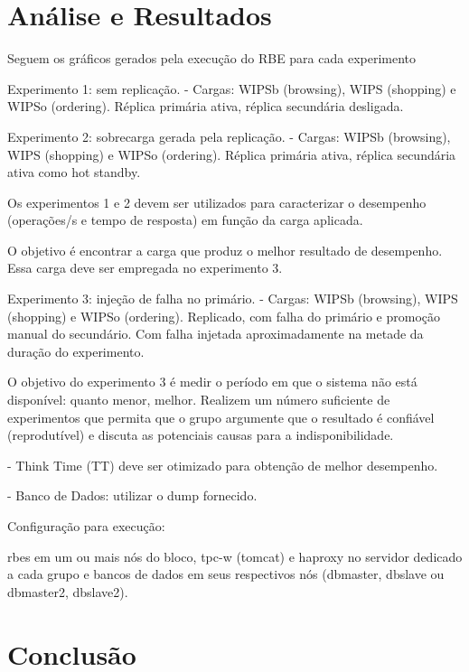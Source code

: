 \documentclass[11pt,twoside]{article}
\begin{document}
\section{An\'alise e Resultados}
\setlength{\parindent}{4ex}

Seguem os gráficos gerados pela execução do RBE para cada experimento

Experimento 1: sem replicação.
- Cargas: WIPSb (browsing), WIPS (shopping) e WIPSo (ordering).
Réplica primária ativa, réplica secundária desligada.

Experimento 2: sobrecarga gerada pela replicação.
- Cargas: WIPSb (browsing), WIPS (shopping) e WIPSo (ordering).
Réplica primária ativa, réplica secundária  ativa como hot standby.

Os  experimentos  1 e  2  devem  ser  utilizados para  caracterizar  o
desempenho  (operações/s  e tempo  de  resposta)  em função  da  carga
aplicada.

O  objetivo é  encontrar  a carga  que produz  o  melhor resultado  de
desempenho. Essa carga deve ser empregada no experimento 3.


Experimento 3: injeção de falha no primário.
- Cargas: WIPSb (browsing), WIPS (shopping) e WIPSo (ordering).
Replicado, com falha  do primário e promoção manual  do secundário.  Com
falha  injetada  aproximadamente  na  metade da  duração  do
experimento.

O objetivo  do experimento 3  é medir o período  em que o  sistema não
está disponível: quanto menor, melhor.  Realizem um número suficiente de
experimentos  que permita  que o  grupo  argumente que  o resultado  é
confiável  (reprodutível)  e  discuta   as  potenciais  causas  para  a
indisponibilidade.

- Think Time (TT)  deve ser otimizado  para  obtenção  de  melhor  desempenho.

- Banco  de  Dados: utilizar o dump fornecido.

Configuração para execução:

rbes em um ou mais nós do  bloco, tpc-w (tomcat) e haproxy no servidor
dedicado  a cada  grupo  e bancos  de dados  em  seus respectivos  nós
(dbmaster, dbslave ou dbmaster2, dbslave2).


\section{Conclus\~ao}
\end{document}
